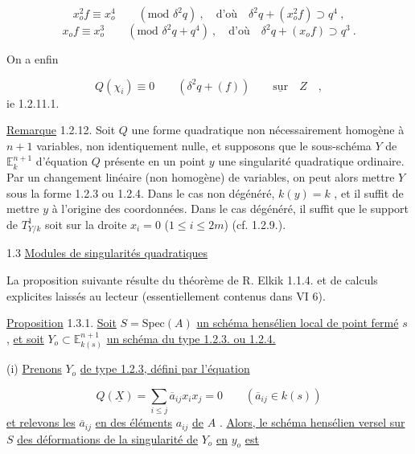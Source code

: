 \begin{equation*}
x_o^2 f \equiv x_o^4 \qquad (\mbox{mod } \delta^2 q) \ , \quad \mbox{d'où} \quad \delta^2 q + (x_o^2 f) \supset q^4 \ ,
\end{equation*}
\begin{equation*}
x_o f \equiv x_o^3 \qquad (\mbox{mod } \delta^2 q + q^4) \ , \quad \mbox{d'où} \quad \delta^2 q + (x_o f) \supset q^3 \ .
\end{equation*}


On a enfin

\begin{equation*}
Q(\chi_i) \equiv 0 \qquad (\delta^2 q + (f)) \qquad \underline{\mathrm{sur}} \quad Z \quad ,
\end{equation*}
ie 1.2.11.1.

\underline{Remarque} 1.2.12.  Soit $Q$ une forme quadratique non nécessairement homogène à $n+1$ variables, non identiquement nulle, et supposons que le sous-schéma $Y$ de $\mathbb{E}_k^{n+1}$ d'équation $Q$ présente en un point $y$ une singularité quadratique ordinaire. Par un changement linéaire (non homogène) de variables, on peut alors mettre $Y$ sous la forme 1.2.3 ou 1.2.4. Dans le cas non dégénéré, $k(y) = k$ , et il suffit de mettre $y$ à l'origine des coordonnées. Dans le cas dégénéré, il suffit que le support de $T^1_{Y/k}$ soit sur la droite $x_i = 0$  ($1 \leq i \leq 2m$)  (cf. 1.2.9.).


1.3  \underline{Modules de singularités quadratiques}

La proposition suivante résulte du théorème de R. Elkik 1.1.4. et de calculs explicites laissés au lecteur (essentiellement contenus dans VI 6).

\underline{Proposition} 1.3.1.  \underline{Soit} $S = \mathrm{Spec}(A)$ \underline{un schéma hensélien local de point fermé} $s$ , \underline{et soit} $Y_o \subset \mathbb{E}^{n+1}_{k(s)}$ \underline{un schéma du type 1.2.3. ou 1.2.4.}

(i) \underline{Prenons} $Y_o$ \underline{de type 1.2.3, défini par l'équation}

\begin{equation*}
Q(\underline{X}) = \sum_{i \leq j} \overline{a}_{ij} x_i x_j = 0 \qquad (\overline{a}_{ij} \in k(s))
\end{equation*}
\underline{et relevons les} $\overline{a}_{ij}$ \underline{en des éléments} $a_{ij}$ \underline{de} $A$ . \underline{Alors, le schéma hensélien versel sur} $S$ \underline{des déformations de la singularité de} $Y_o$ \underline{en} $y_o$ \underline{est}

